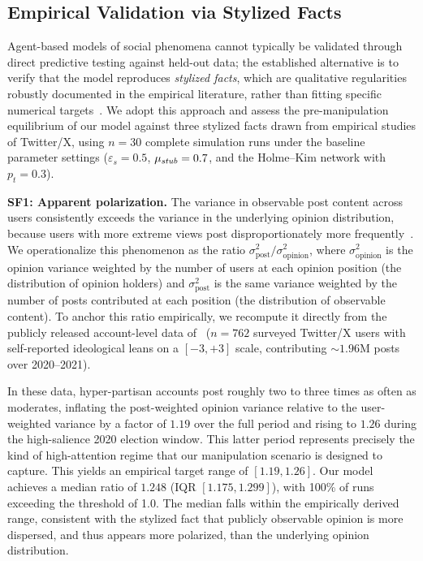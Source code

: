 \documentclass[pdflatex,sn-mathphys-num]{sn-jnl}%
\theoremstyle{thmstyleone}%
\theoremstyle{thmstyletwo}%
\theoremstyle{thmstylethree}%
\def\Stubbornness{\mu_{\it stub}}
\def\ThofOpPreval{\varepsilon_s}
\begin{document}
\subsection{Empirical Validation via Stylized Facts}\label{sf_validation}

Agent-based models of social phenomena cannot typically be validated through
direct predictive testing against held-out data;
the established alternative is to verify that the model
reproduces \emph{stylized facts}, which are qualitative regularities robustly
documented in the empirical literature, rather than fitting specific
numerical targets~\cite{Fagiolo2007}.
We adopt this approach and assess the pre-manipulation equilibrium of
our model against three stylized facts drawn from empirical studies
of Twitter/X, using $n = 30$ complete simulation runs under the baseline
parameter settings ($\ThofOpPreval = 0.5$, $\Stubbornness = 0.7$, and the
Holme--Kim network with $p_t = 0.3$).

\noindent\textbf{SF1: Apparent polarization.}
The variance in observable post content across users consistently
exceeds the variance in the underlying opinion distribution,
because users with more extreme views post disproportionately
more frequently~\cite{Buntain2025}.
We operationalize this phenomenon as the ratio $\sigma_{\mathrm{post}}^{2} / \sigma_{\mathrm{opinion}}^{2}$,
where $\sigma_{\mathrm{opinion}}^{2}$ is the opinion variance weighted by the
number of users at each opinion position (the distribution of opinion holders)
and $\sigma_{\mathrm{post}}^{2}$ is the same variance weighted by the number of
posts contributed at each position (the distribution of observable content).
To anchor this ratio empirically, we recompute it directly from the
publicly released account-level data of~\cite{Buntain2025}
($n = 762$ surveyed Twitter/X users with self-reported ideological leans on a
$[-3, +3]$ scale, contributing $\sim\!1.96$M posts over 2020--2021).

In these data, hyper-partisan accounts post roughly two to three times as
often as moderates, inflating the post-weighted opinion variance relative to
the user-weighted variance by a factor of $1.19$ over the full period and
rising to $1.26$ during the high-salience 2020 election window. This latter period represents
precisely the
kind of high-attention regime that our manipulation scenario is designed to capture.
This yields an empirical target range of $[1.19, 1.26]$.
Our model achieves a median ratio of $1.248$ (IQR $[1.175, 1.299]$),
with 100\% of runs exceeding the threshold of 1.0.
The median falls within the empirically derived range, consistent with
the stylized fact that publicly observable
opinion is more dispersed, and thus appears more polarized, than
the underlying opinion distribution.
\end{document}
